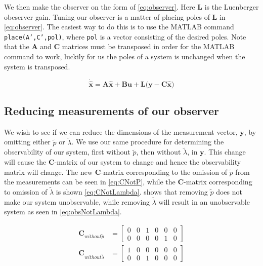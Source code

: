 We then make the observer on the form of \cref{eq:observer}. Here \textbf{L} is the Luenberger obeserver gain\cite{Chen2014}. Tuning our observer is a matter of placing poles of $\textbf{L}$ in \cref{eq:observer}. The easiest way to do this is to use the MATLAB command \texttt{place(A',C',pol)}, where \texttt{pol} is a vector consisting of the desired poles. Note that the $\textbf{A}$ and $\textbf{C}$ matrices must be transposed in order for the MATLAB command to work, luckily for us the poles of a system is unchanged when the system is transposed\cite{regtek}.

\begin{equation}\label{eq:observer}
    \mathbf{\dot{\hat{x}} = A\hat{x} + Bu + L(y - C\hat{x}})
\end{equation}

\subsection{Reducing measurements of our observer}
We wish to see if we can reduce the dimensions of the measurement vector, $\mathbf{y}$, by omitting either $\tilde{p}$ or $\tilde{\lambda}$. We use our same procedure for determining the observability of our system, first without $\tilde{p}$, then without $\tilde{\lambda}$, in $\mathbf{y}$. This change will cause the $\mathbf{C}$-matrix of our system to change and hence the observability matrix will change. The new $\mathbf{C}$-matrix corresponding to the omission of $\tilde{p}$ from the measurements can be seen in \cref{eq:CNotP}, while the $\mathbf{C}$-matrix corresponding to omission of $\tilde{\lambda}$ is shown \cref{eq:CNotLambda}.
 shows that removing $\tilde{p}$ does not make our system unobservable, while removing $\tilde{\lambda}$ will result in an unobservable system as seen in \cref{eq:obsNotLambda}.

\begin{subequations}
    \begin{align}
        \mathbf{C}_{without \tilde{p}} &= \label{eq:CNotP}
        \begin{bmatrix}
            0 & 0 & 1 & 0 & 0 & 0 \\
            0 & 0 & 0 & 0 & 1 & 0
        \end{bmatrix}
        \\
        \mathbf{C}_{without \tilde{\lambda}} &= \label{eq:CNotLambda}
        \begin{bmatrix}
            1 & 0 & 0 & 0 & 0 & 0 \\
            0 & 0 & 1 & 0 & 0 & 0
        \end{bmatrix}
    \end{align}
\end{subequations}

